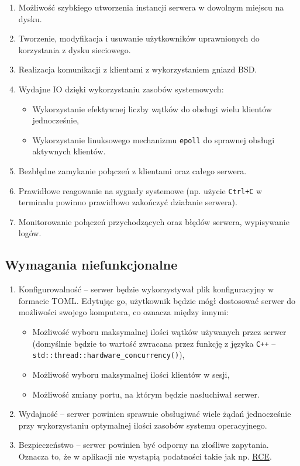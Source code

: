 \documentclass[10pt,a4paper]{article}
\begin{document}
\begin{enumerate}
    \item Możliwość szybkiego utworzenia instancji serwera w dowolnym miejscu na dysku.
    \item Tworzenie, modyfikacja i usuwanie użytkowników uprawnionych do korzystania z dysku sieciowego.
    \item Realizacja komunikacji z klientami z wykorzystaniem gniazd BSD.
    \item Wydajne IO dzięki wykorzystaniu zasobów systemowych:
    \begin{itemize}
        \item Wykorzystanie efektywnej liczby wątków do obsługi wielu klientów jednocześnie,
        \item Wykorzystanie linuksowego mechanizmu \texttt{epoll} do sprawnej obsługi aktywnych klientów.
    \end{itemize}
    \item Bezbłędne zamykanie połączeń z klientami oraz całego serwera.
    \item Prawidłowe reagowanie na sygnały systemowe (np. użycie \texttt{Ctrl+C} w terminalu powinno prawidłowo zakończyć działanie serwera).
    \item Monitorowanie połączeń przychodzących oraz błędów serwera, wypisywanie logów.
\end{enumerate}

\subsection{Wymagania niefunkcjonalne}

\begin{enumerate}
    \item Konfigurowalność -- serwer będzie wykorzystywał plik konfiguracyjny w formacie TOML. Edytując go, użytkownik będzie mógł dostosować serwer do możliwości swojego komputera, co oznacza między innymi:
    \begin{itemize}
        \item Możliwość wyboru maksymalnej ilości wątków używanych przez serwer (domyślnie będzie to wartość zwracana przez funkcję z języka \texttt{C++} -- \texttt{std::thread::hardware\_concurrency()}),
        \item Możliwość wyboru maksymalnej ilości klientów w sesji,
        \item Możliwość zmiany portu, na którym będzie nasłuchiwał serwer.
    \end{itemize}

    \item Wydajność -- serwer powinien sprawnie obsługiwać wiele żądań jednocześnie przy wykorzystaniu optymalnej ilości zasobów systemu operacyjnego.

    \item Bezpieczeństwo -- serwer powinien być odporny na złośliwe zapytania. Oznacza to, że w aplikacji nie wystąpią podatności takie jak np. \href{https://en.wikipedia.org/wiki/Arbitrary_code_execution}{RCE}.
\end{enumerate}
\end{document}
